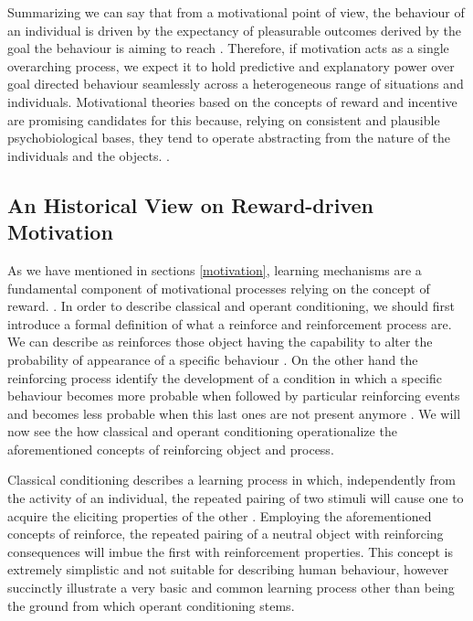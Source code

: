 
Summarizing we can say that from a motivational point of view, the behaviour of an individual is driven by the expectancy of pleasurable outcomes derived by the goal the behaviour is aiming to reach \cite{berridge2004motivation}. Therefore, if motivation acts as a single overarching process, we expect it to hold predictive and explanatory power over goal directed behaviour seamlessly across a heterogeneous range of situations and individuals. Motivational theories based on the concepts of reward and incentive are promising candidates for this because, relying on consistent and plausible psychobiological bases, they tend to operate abstracting from the nature of the individuals and the objects. \cite{ikemoto1999role,berridge1998role,salamone2002motivational,berridge2004motivation,armony2013cambridge,corbit2015learning}.

\subsection{An Historical View on Reward-driven Motivation}
\label{motivation_hist}
As we have mentioned in sections \ref{motivation}, learning mechanisms are a fundamental component of motivational processes relying on the concept of reward. \lorem. In order to describe classical and operant conditioning, we should first introduce a formal definition of what a reinforce and reinforcement process are. We can describe as reinforces those object having the capability to alter the probability of appearance of a specific behaviour \cite{kling1971woodworth,skinner1953science,squire2012fundamental}.  On the other hand the reinforcing process identify the development of a condition in which a specific behaviour becomes more probable when followed by particular reinforcing events and becomes less probable when this last ones are not present anymore \cite{kling1971woodworth}. We will now see the how classical and operant conditioning operationalize the aforementioned concepts of reinforcing object and process. 

Classical conditioning describes a learning process in which, independently from the activity of an individual, the repeated pairing of two stimuli will cause one to acquire the eliciting properties of the other \cite{squire2012fundamental}. Employing the aforementioned concepts of reinforce, the repeated pairing of a neutral object with reinforcing consequences will imbue the first with reinforcement properties. This concept is extremely simplistic and not suitable for describing human behaviour, however succinctly illustrate a very basic and common learning process other than being the ground from which operant conditioning stems. 

